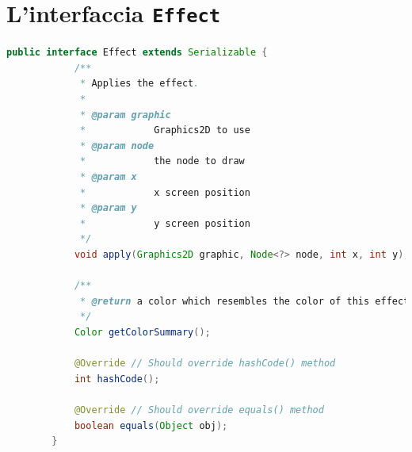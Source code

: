 

\appendix
\chapter{L'interfaccia \texttt{Effect}}\label{appendix:effect}
    \begin{lstlisting}[language=Java]
        public interface Effect extends Serializable {
            /**
             * Applies the effect.
             *
             * @param graphic
             *            Graphics2D to use
             * @param node
             *            the node to draw
             * @param x
             *            x screen position
             * @param y
             *            y screen position
             */
            void apply(Graphics2D graphic, Node<?> node, int x, int y);

            /**
             * @return a color which resembles the color of this effect
             */
            Color getColorSummary();

            @Override // Should override hashCode() method
            int hashCode();

            @Override // Should override equals() method
            boolean equals(Object obj);
        }
    \end{lstlisting}

